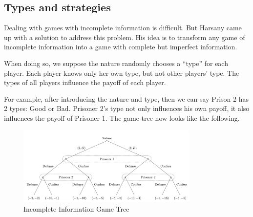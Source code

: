 \documentclass[12pt, oneside]{article}
\begin{document}
\begin{center}
\end{center}

\subsection{Types and strategies}
Dealing with games with incomplete information is difficult. But Harsany came up with a solution to address this problem. His idea is to transform any game of incomplete information into a game with complete but imperfect information.

When doing so, we suppose the nature randomly chooses a “type” for each player. Each player knows only her own type, but not other players' type. The types of all players influence the payoff of each player.

For example, after introducing the nature and type, then we can say Prison 2 has 2 types: Good or Bad. Prisoner 2's type not only influences his own payoff, it also influences the payoff of Prisoner 1.
The game tree now looks like the following.
\begin{figure}[h!]
    \centering
    \includegraphics[width=0.8\textwidth]{Figure/incom_tree.png} 
    \caption{Incomplete Information Game Tree} 
    \label{fig:2} 
\end{figure}
\end{document}
